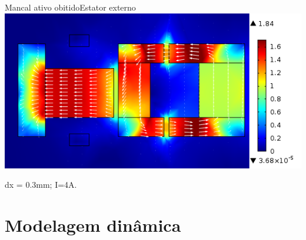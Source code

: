 \documentclass{beamer}
\begin{document}
\begin{frame}{Mancal ativo obitido}{Estator externo}
\includegraphics[width=1\linewidth]{Simulacoes/Ativo/dx=03_I=4}

dx = 0.3mm; I=4A.
\end{frame}

\section{Modelagem dinâmica}
\end{document}

